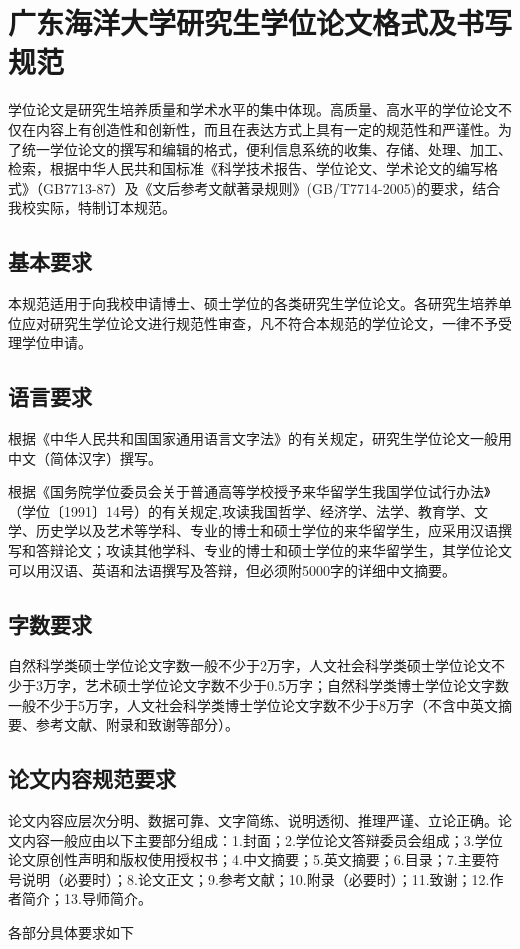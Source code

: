 \chapter{广东海洋大学研究生学位论文格式及书写规范}
学位论文是研究生培养质量和学术水平的集中体现。高质量、高水平的学位论文不仅在内容上有创造性和创新性，而且在表达方式上具有一定的规范性和严谨性。为了统一学位论文的撰写和编辑的格式，便利信息系统的收集、存储、处理、加工、检索，根据中华人民共和国标准《科学技术报告、学位论文、学术论文的编写格式》（GB7713-87）及《文后参考文献著录规则》(GB/T7714-2005)的要求，结合我校实际，特制订本规范。
\section{基本要求}
本规范适用于向我校申请博士、硕士学位的各类研究生学位论文。各研究生培养单位应对研究生学位论文进行规范性审查，凡不符合本规范的学位论文，一律不予受理学位申请。
\section{语言要求}
根据《中华人民共和国国家通用语言文字法》的有关规定，研究生学位论文一般用中文（简体汉字）撰写。

根据《国务院学位委员会关于普通高等学校授予来华留学生我国学位试行办法》（学位〔1991〕14号）的有关规定,攻读我国哲学、经济学、法学、教育学、文学、历史学以及艺术等学科、专业的博士和硕士学位的来华留学生，应采用汉语撰写和答辩论文；攻读其他学科、专业的博士和硕士学位的来华留学生，其学位论文可以用汉语、英语和法语撰写及答辩，但必须附5000字的详细中文摘要。
\section{字数要求}
自然科学类硕士学位论文字数一般不少于2万字，人文社会科学类硕士学位论文不少于3万字，艺术硕士学位论文字数不少于0.5万字；自然科学类博士学位论文字数一般不少于5万字，人文社会科学类博士学位论文字数不少于8万字（不含中英文摘要、参考文献、附录和致谢等部分）。
\section{论文内容规范要求}
论文内容应层次分明、数据可靠、文字简练、说明透彻、推理严谨、立论正确。论文内容一般应由以下主要部分组成：1.封面；2.学位论文答辩委员会组成；3.学位论文原创性声明和版权使用授权书；4.中文摘要；5.英文摘要；6.目录；7.主要符号说明（必要时）；8.论文正文；9.参考文献；10.附录（必要时）；11.致谢；12.作者简介；13.导师简介。

各部分具体要求如下

